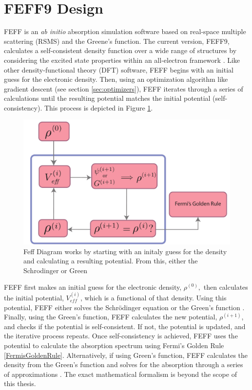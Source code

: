 \section{FEFF9 Design}

FEFF is an \textit{ab initio} absorption simulation software based on real-space multiple scattering (RSMS) and the Greene's function. The current version, FEFF9, calculates a self-consistent density function over a wide range of structures by considering the excited state properties within an all-electron framework \cite{feff-new-dev}. Like other density-functional theory (DFT) software, FEFF begins with an initial guess for the electronic density. Then, using an optimization algorithm like gradient descent (see section \ref{sec:optimizers}), FEFF iterates through a series of calculations until the resulting potential matches the initial potential (self-consistency). This process is depicted in Figure \ref{fig:feff-dft-diagram}.

\begin{figure}
    \centering
    \includegraphics[width=\linewidth]{Chapters/Figures/dft-feff-diagram.pdf}
    \caption[FEFF Diagram]{Feff Diagram works by starting with an initaly guess for the density and calculating a resulting potential. From this, either the Schrodinger or Green}
    \label{fig:feff-dft-diagram}
\end{figure}

FEFF first makes an initial guess for the electronic density, $ \rho^{(0)}, $  then calculates the initial potential, $ V_{eff}^{(i)} $, which is a functional of that density. Using this potential, FEFF either solves the Schr{\"o}dinger equation or the Green's function \cite{greens-function-xafs-2021}. Finally, using the Green's function, FEFF calculates the new potential, $ \rho^{(i+1)} $, and checks if the potential is self-consistent. If not, the potential is updated, and the iterative process repeats. Once self-consistency is achieved, FEFF uses the potential to calculate the absorption spectrum using Fermi's Golden Rule \ref{FermisGoldenRule}. Alternatively, if using Green's function, FEFF calculates the density from the Green's function and solves for the absorption through a series of approximations \cite{feff-citation} \cite{rehr2010parameter}. The exact mathematical formalism is beyond the scope of this thesis.

